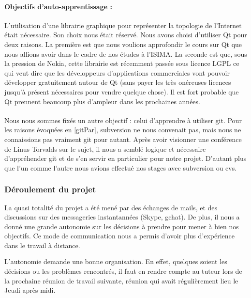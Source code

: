 \paragraph{Objectifs d'auto-apprentissage : }
\paragraph{}  L'utilisation d'une librairie graphique pour représenter la topologie de l'Internet était nécessaire. Son choix nous était réservé. Nous avons choisi d'utiliser Qt pour deux raisons. La première est que nous voulions approfondir le cours sur Qt que nous allions avoir dans le cadre de nos études à l'ISIMA. La seconde est que, sous la pression de Nokia, cette librairie est récemment passée sous licence LGPL ce qui veut dire que les développeurs d'applications commerciales vont pouvoir développer gratuitement autour de Qt (sans payer les très onéreuses licences jusqu'à présent nécessaires pour vendre quelque chose). Il est fort probable que Qt prennent beaucoup plus d'ampleur dans les prochaines années.

\paragraph{} Nous nous sommes fixés un autre objectif : celui d'apprendre à utiliser git. Pour les raisons évoquées en \ref{gitPar}, subversion ne nous convenait pas, mais nous ne connaissions pas vraiment git pour autant. Après avoir visionner une conférence de Linus Torvalds sur le sujet, il nous a semblé logique et nécessaire d'appréhender git et de s'en servir en particulier pour notre projet. D'autant plus que l'un comme l'autre nous avions effectué nos stages avec subversion ou cvs.

\subsubsection{Déroulement du projet}

La quasi totalité du projet a été mené par des échanges de mails, et des discussions sur des messageries instantannées (Skype, gchat). De plus, il nous a donné une grande autonomie sur les décisions à prendre pour mener à bien nos objectifs. Ce mode de communication nous a permis d'avoir plus d'expérience dans le travail à distance.

L'autonomie demande une bonne organisation. En effet, quelques soient les décisions ou les problèmes rencontrés, il faut en rendre compte au tuteur lors de la prochaine réunion de travail suivante, réunion qui avait régulièrement lieu le Jeudi après-midi.

